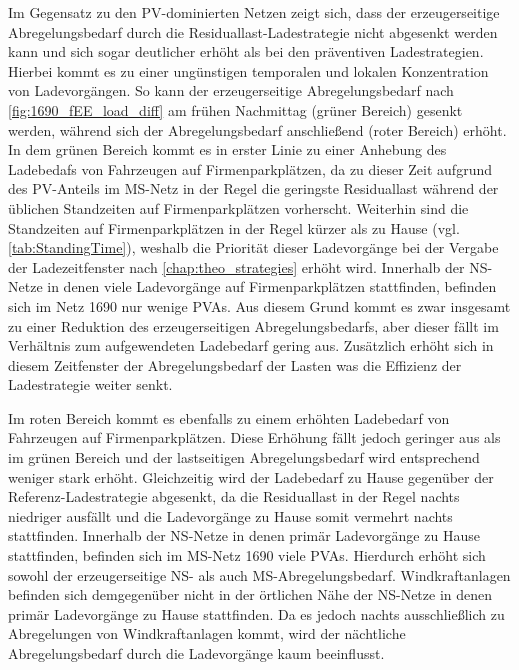 Im Gegensatz zu den \gls{PV}-dominierten Netzen zeigt sich, dass der erzeugerseitige Abregelungsbedarf durch die Residuallast-Ladestrategie nicht abgesenkt werden kann und sich sogar deutlicher erhöht als bei den präventiven Ladestrategien.
Hierbei kommt es zu einer ungünstigen temporalen und lokalen Konzentration von Ladevorgängen.
So kann der erzeugerseitige Abregelungsbedarf nach \autoref{fig:1690_fEE_load_diff} am frühen Nachmittag (grüner Bereich) gesenkt werden, während sich der Abregelungsbedarf anschließend (roter Bereich) erhöht.
In dem grünen Bereich kommt es in erster Linie zu einer Anhebung des Ladebedafs von Fahrzeugen auf Firmenparkplätzen, da zu dieser Zeit aufgrund des \gls{PV}-Anteils im \gls{MS}-Netz in der Regel die geringste Residuallast während der üblichen Standzeiten auf Firmenparkplätzen vorherscht.
Weiterhin sind die Standzeiten auf Firmenparkplätzen in der Regel kürzer als zu Hause (vgl. \autoref{tab:StandingTime}), weshalb die Priorität dieser Ladevorgänge bei der Vergabe der Ladezeitfenster nach \autoref{chap:theo_strategies} erhöht wird.
Innerhalb der \gls{NS}-Netze in denen viele Ladevorgänge auf Firmenparkplätzen stattfinden, befinden sich im Netz \num{1690} nur wenige \glspl{PVA}.
Aus diesem Grund kommt es zwar insgesamt zu einer Reduktion des erzeugerseitigen Abregelungsbedarfs, aber dieser fällt im Verhältnis zum aufgewendeten Ladebedarf gering aus.
Zusätzlich erhöht sich in diesem Zeitfenster der Abregelungsbedarf der Lasten was die Effizienz der Ladestrategie weiter senkt.



Im roten Bereich kommt es ebenfalls zu einem erhöhten Ladebedarf von Fahrzeugen auf Firmenparkplätzen.
Diese Erhöhung fällt jedoch geringer aus als im grünen Bereich und der lastseitigen Abregelungsbedarf wird entsprechend weniger stark erhöht.
Gleichzeitig wird der Ladebedarf zu Hause gegenüber der Referenz-Ladestrategie abgesenkt, da die Residuallast in der Regel nachts niedriger ausfällt und die Ladevorgänge zu Hause somit vermehrt nachts stattfinden.
Innerhalb der \gls{NS}-Netze in denen primär Ladevorgänge zu Hause stattfinden, befinden sich im \gls{MS}-Netz \num{1690} viele \glspl{PVA}.
Hierdurch erhöht sich sowohl der erzeugerseitige \gls{NS}- als auch \gls{MS}-Abregelungsbedarf.
Windkraftanlagen befinden sich demgegenüber nicht in der örtlichen Nähe der \gls{NS}-Netze in denen primär Ladevorgänge zu Hause stattfinden.
Da es jedoch nachts ausschließlich zu Abregelungen von Windkraftanlagen kommt, wird der nächtliche Abregelungsbedarf durch die Ladevorgänge kaum beeinflusst.



